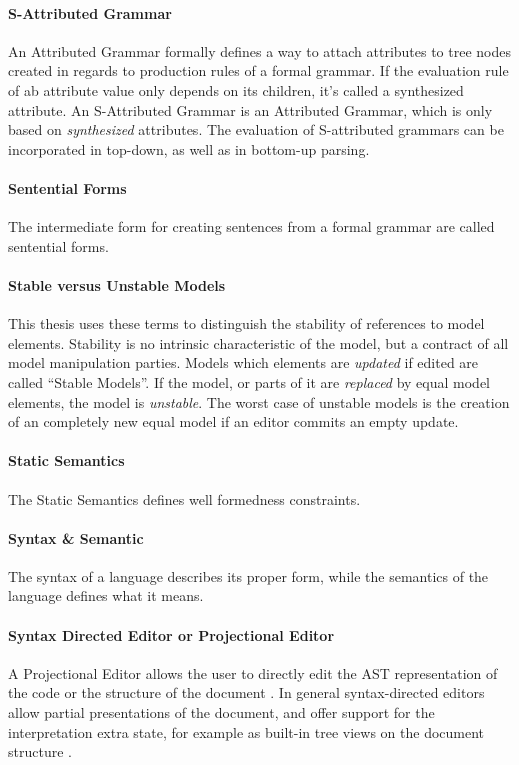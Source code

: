 \paragraph{S-Attributed Grammar} 
An Attributed Grammar formally defines a way to attach attributes to tree nodes created in regards to production rules of a formal grammar. If the evaluation rule of ab attribute value only depends on its children, it's called a synthesized attribute. An S-Attributed Grammar is an Attributed Grammar, which is only based on \emph{synthesized} attributes. The evaluation of S-attributed grammars can be incorporated in top-down, as well as in bottom-up parsing. \cite{ParserBook}

\paragraph{Sentential Forms}   
The intermediate form for creating sentences from a formal grammar are called sentential forms. \cite{ParserBook}

\paragraph{Stable versus Unstable Models}
This thesis uses these terms to distinguish the stability of references to model elements. Stability is no intrinsic characteristic of the model, but a contract of all model manipulation parties. Models which elements are \emph{updated} if edited are called ``Stable Models''. If the model, or parts of it are \emph{replaced} by equal model elements, the model is \emph{unstable}. The worst case of unstable models is the creation of an completely new equal model if an editor commits an empty update.

\paragraph{Static Semantics} The Static Semantics defines well formedness constraints. \cite{MDSD}

\paragraph{Syntax \& Semantic}  
The syntax of a language describes its proper form, while the semantics of the language defines what it means. \cite{DragonBook}

\paragraph{Syntax Directed Editor or Projectional Editor} A Projectional Editor allows the user to directly edit the AST representation of the code or the structure of the document \cite{MPS}. In general syntax-directed editors allow partial presentations of the document, and offer support for the interpretation extra state, for example as built-in tree views on the document structure \cite{proxima}.

